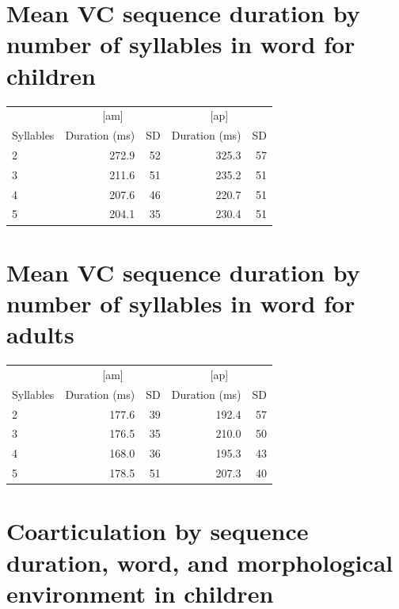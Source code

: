 \documentclass[a4paper,man,floatsintext,natbib,donotrepeattitle, apacite]{apa6}
\begin{document}
\section{Mean VC sequence duration by number of syllables in word for children}\label{app:app-G}
\begin{table}[H]
\centering
\begin{tabular}[t]{lrrrr}
\toprule
\multicolumn{1}{c}{ } & \multicolumn{2}{c}{[am]} & \multicolumn{2}{c}{[ap]} \\
\cmidrule(l{3pt}r{3pt}){2-3} \cmidrule(l{3pt}r{3pt}){4-5}
Syllables & Duration (ms) & SD  & Duration (ms) & SD\\
\midrule
2 & 272.9 & 52 & 325.3 & 57\\
3 & 211.6 & 51 & 235.2 & 51\\
4 & 207.6 & 46 & 220.7 & 51\\
5 & 204.1 & 35 & 230.4 & 51\\
\bottomrule
\end{tabular}
\end{table}

\section{Mean VC sequence duration by number of syllables in word for adults}\label{app:app-H}
\begin{table}[H]
\centering
\begin{tabular}[t]{lrrrr}
\toprule
\multicolumn{1}{c}{ } & \multicolumn{2}{c}{[am]} & \multicolumn{2}{c}{[ap]} \\
\cmidrule(l{3pt}r{3pt}){2-3} \cmidrule(l{3pt}r{3pt}){4-5}
Syllables & Duration (ms) & SD  & Duration (ms) & SD\\
\midrule
2 & 177.6 & 39 & 192.4 & 57\\
3 & 176.5 & 35 & 210.0 & 50\\
4 & 168.0 & 36 & 195.3 & 43\\
5 & 178.5 & 51 & 207.3 & 40\\
\bottomrule
\end{tabular}
\end{table}



\section{Coarticulation by sequence duration, word, and morphological environment in children}\label{app:app-I}
\end{document}
